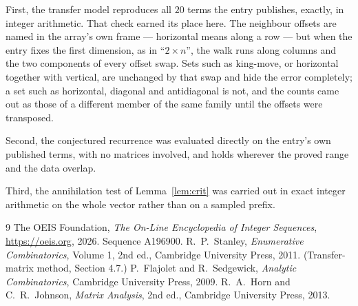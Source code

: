 \documentclass[11pt,a4paper]{article}
\theoremstyle{plain}
\theoremstyle{definition}
\begin{document}
First, the transfer model reproduces all $20$ terms the entry publishes, exactly, in
integer arithmetic. That check earned its place here. The neighbour offsets are named in the
array's own frame --- horizontal means along a row --- but when the entry fixes the first
dimension, as in ``$2\times n$'', the walk runs along columns and the two components of every
offset swap. Sets such as king-move, or horizontal together with vertical, are unchanged by
that swap and hide the error completely; a set such as horizontal, diagonal and antidiagonal
is not, and the counts came out as those of a different member of the same family until the
offsets were transposed.

Second, the conjectured recurrence was evaluated directly on the entry's own published terms,
with no matrices involved, and holds wherever the proved range and the data overlap.

Third, the annihilation test of Lemma~\ref{lem:crit} was carried out in exact integer
arithmetic on the whole vector rather than on a sampled prefix.

\begin{thebibliography}{9}
 The OEIS Foundation, \emph{The On-Line Encyclopedia of Integer
Sequences}, \url{https://oeis.org}, 2026. Sequence A196900.
 R.~P.~Stanley, \emph{Enumerative Combinatorics}, Volume 1, 2nd ed.,
Cambridge University Press, 2011. (Transfer-matrix method, Section 4.7.)
 P.~Flajolet and R.~Sedgewick, \emph{Analytic Combinatorics}, Cambridge
University Press, 2009.
 R.~A.~Horn and C.~R.~Johnson, \emph{Matrix Analysis}, 2nd ed., Cambridge
University Press, 2013.
\end{thebibliography}
\end{document}
